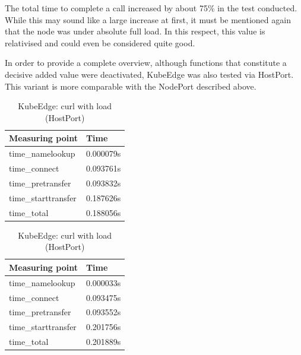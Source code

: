 \documentclass[MSC,Master,english]{twbook}%
\begin{document}
The total time to complete a call increased by about 75\% in the test conducted. While this may sound like a large increase at first, it must be mentioned again that the node was under absolute full load. In this respect, this value is relativised and could even be considered quite good.

In order to provide a complete overview, although functions that constitute a decisive added value were deactivated, KubeEdge was also tested via HostPort. This variant is more comparable with the NodePort described above.

\begin{table}[ht]
    \begin{center}
        \begin{minipage}{.49\linewidth}
            \begin{center}
                \begin{tabular}{|l|l|}
                    \hline
                    Measuring point & Time \\
                    \hline
                    time\_namelookup & 0.000079s \\
                    time\_connect & 0.093761s \\
                    time\_pretransfer & 0.093832s \\
                    time\_starttransfer & 0.187626s \\
                    \hline
                    time\_total & 0.188056s \\
                    \hline
                \end{tabular}
                \caption{KubeEdge: curl no load (HostPort)}
                \label{tab:ke-con-noload-np}
            \end{center}
        \end{minipage}
        \begin{minipage}{.49\linewidth}
            \begin{center}
                \begin{tabular}{|l|l|}
                    \hline
                    Measuring point & Time \\
                    \hline
                    time\_namelookup & 0.000033s \\
                    time\_connect & 0.093475s \\
                    time\_pretransfer & 0.093552s \\
                    time\_starttransfer & 0.201756s \\
                    \hline
                    time\_total & 0.201889s \\
                    \hline
                \end{tabular}
                \caption{KubeEdge: curl with load (HostPort)}
                \label{tab:ke-con-load-np}
            \end{center}
        \end{minipage}
    \end{center}
\end{table}
\end{document}
